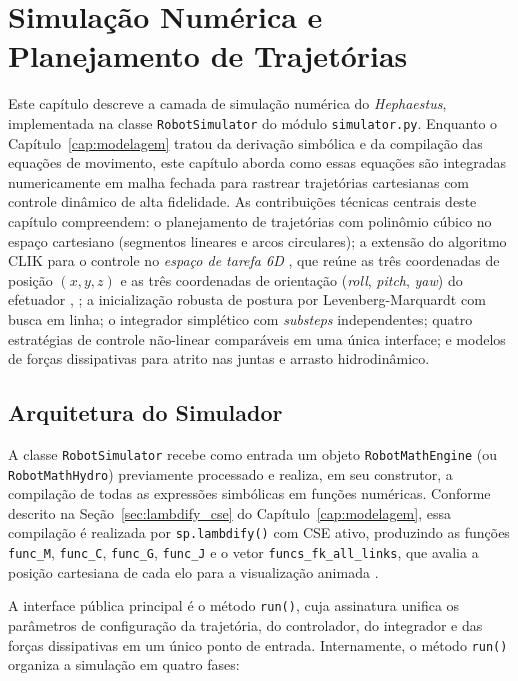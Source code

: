 \chapter{Simulação Numérica e Planejamento de Trajetórias}
\label{cap:simulacao}

Este capítulo descreve a camada de simulação numérica do \textit{Hephaestus}, implementada na classe \texttt{RobotSimulator} do módulo \texttt{simulator.py}. Enquanto o Capítulo~\ref{cap:modelagem} tratou da derivação simbólica e da compilação das equações de movimento, este capítulo aborda como essas equações são integradas numericamente em malha fechada para rastrear trajetórias cartesianas com controle dinâmico de alta fidelidade. As contribuições técnicas centrais deste capítulo compreendem: o planejamento de trajetórias com polinômio cúbico no espaço cartesiano (segmentos lineares e arcos circulares); a extensão do algoritmo CLIK para o controle no \emph{espaço de tarefa 6D} , que reúne as três coordenadas de posição $(x, y, z)$ e as três coordenadas de orientação (\textit{roll}, \textit{pitch}, \textit{yaw}) do efetuador , ; a inicialização robusta de postura por Levenberg-Marquardt com busca em linha; o integrador simplético com \textit{substeps} independentes; quatro estratégias de controle não-linear comparáveis em uma única interface; e modelos de forças dissipativas para atrito nas juntas e arrasto hidrodinâmico.

\section{Arquitetura do Simulador}
\label{sec:arq_simulador}

A classe \texttt{RobotSimulator} recebe como entrada um objeto \texttt{RobotMathEngine} (ou \texttt{RobotMathHydro}) previamente processado e realiza, em seu construtor, a compilação de todas as expressões simbólicas em funções numéricas. Conforme descrito na Seção~\ref{sec:lambdify_cse} do Capítulo~\ref{cap:modelagem}, essa compilação é realizada por \texttt{sp.lambdify()} com CSE ativo, produzindo as funções \texttt{func\_M}, \texttt{func\_C}, \texttt{func\_G}, \texttt{func\_J} e o vetor \texttt{funcs\_fk\_all\_links}, que avalia a posição cartesiana de cada elo para a visualização animada \cite{meurer2017sympy}.

A interface pública principal é o método \texttt{run()}, cuja assinatura unifica os parâmetros de configuração da trajetória, do controlador, do integrador e das forças dissipativas em um único ponto de entrada. Internamente, o método \texttt{run()} organiza a simulação em quatro fases:

